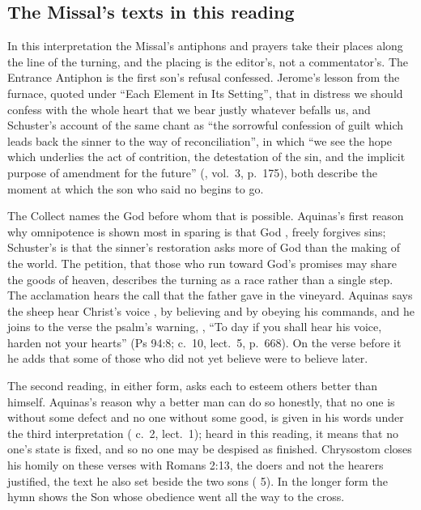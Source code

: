 \subsection{The Missal's texts in this reading}

In this interpretation the Missal's antiphons and prayers take their places
along the line of the turning, and the placing is the editor's, not a
commentator's. The Entrance Antiphon is the first son's refusal confessed.
Jerome's lesson from the furnace, quoted under ``Each Element in Its
Setting'', that in distress we should confess with the whole heart that we
bear justly whatever befalls us, and Schuster's account of the same chant as
``the sorrowful confession of guilt which leads back the sinner to the way of
reconciliation'', in which ``we see the hope which underlies the act of
contrition, the detestation of the sin, and the implicit purpose of amendment
for the future'' (, vol.~3, p.~175), both describe the
moment at which the son who said no begins to go.

The Collect names the God before whom that is possible. Aquinas's first reason
why omnipotence is shown most in sparing is that God , freely forgives sins; Schuster's is that the sinner's restoration
asks more of God than the making of the world. The petition, that those who
run toward God's promises may share the goods of heaven, describes the
turning as a race rather than a single step. The acclamation hears the call
that the father gave in the vineyard. Aquinas says the sheep hear Christ's
voice , by believing and by
obeying his commands, and he joins to the verse the psalm's warning,
, ``To day if you shall hear his voice,
harden not your hearts'' (Ps 94:8;  c.~10, lect.~5, p.~668).
On the verse before it he adds that some of those who did not yet believe
were to believe later.

The second reading, in either form, asks each to esteem others better than
himself. Aquinas's reason why a better man can do so honestly, that no one is
without some defect and no one without some good, is given in his words under
the third interpretation ( c.~2, lect.~1); heard in
this reading, it means that no one's state is fixed, and so no one may be
despised as finished. Chrysostom closes his homily on these verses with Romans
2:13, the doers and not the hearers justified, the text he also set beside the
two sons ( 5). In the longer form the hymn shows
the Son whose obedience went all the way to the cross.

